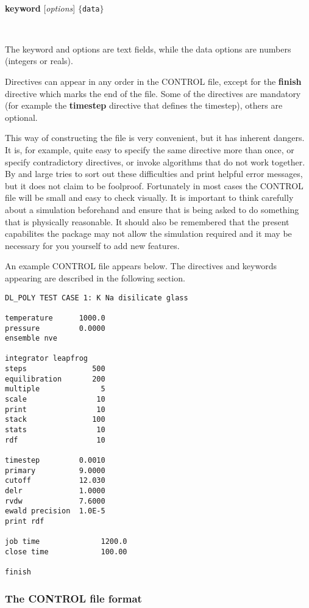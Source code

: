 ~

{\bf keyword} [{\em options}]  $\{${\tt data}$\}$

~

The keyword and options are text fields, while the data options
are numbers (integers or reals).


Directives can appear in any order in the CONTROL file,
except for the {\bf finish} directive which marks the end of the
file. Some of the directives are mandatory (for example the {\bf
timestep} directive that defines the timestep), others are optional.

This way of constructing the file is very convenient, but it has
inherent dangers. It is, for example, quite easy to specify the same
directive more than once, or specify contradictory directives, or
invoke algorithms that do not work together.  By and large
\D{} tries to sort out these difficulties and print helpful error
messages, but it does not claim to be foolproof. Fortunately in most
cases the CONTROL file will be small and easy to check visually. It is
important to think carefully about a simulation beforehand and ensure
that \D{} is being asked to do something that is physically reasonable. It
should also be remembered that the present capabilites the package may not
allow the simulation required and it may be necessary for you yourself
to add new features.

An example CONTROL file appears below. The directives and keywords
appearing are described in the following section.

\begin{verbatim}
DL_POLY TEST CASE 1: K Na disilicate glass

temperature      1000.0
pressure         0.0000
ensemble nve 

integrator leapfrog
steps               500
equilibration       200
multiple              5
scale                10
print                10
stack               100
stats                10
rdf                  10

timestep         0.0010
primary          9.0000
cutoff           12.030
delr             1.0000
rvdw             7.6000
ewald precision  1.0E-5
print rdf 

job time              1200.0
close time            100.00

finish 
\end{verbatim}

\subsubsection{The CONTROL file format}

